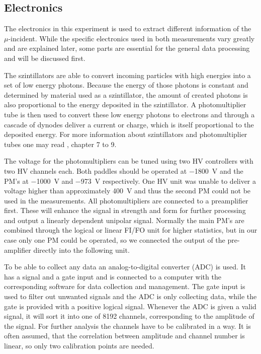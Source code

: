 \subsection{Electronics}
	
	The electronics in this experiment is used to extract different information of the $\mu$-incident.
	While the specific electronics used in both measurements vary greatly and are explained later, some parts are essential for the general data processing and will be discussed first.
	
	The szintillators are able to convert incoming particles with high energies into a set of low energy photons.
	Because the energy of those photons is constant and determined by material used as a szintillator, the amount of created photons is also proportional to the energy deposited in the szintillator.
	A photomultiplier tube is then used to convert these low energy photons to electrons and through a cascade of dynodes deliver a current or charge, which is itself proportional to the deposited energy.
	For more information about szintillators and photomultiplier tubes one may read \cite{leo1994techniques}, chapter 7 to 9.
	
	The voltage for the photomultipliers can be tuned using two HV controllers with two HV channels each.
	Both paddles should be operated at \SI{-1800}{\volt} and the PM's at \SI{-1000}{\volt} and \SI{-973}{\volt} respectively.
	One HV unit was unable to deliver a voltage higher than approximately \SI{400}{\volt} and thus the second PM could not be used in the measurements.
	All photomultipliers are connected to a preamplifier first.
	These will enhance the signal in strength and form for further processing and output a linearly dependent unipolar signal.
	Normally the main PM's are combined through the logical or linear FI/FO unit for higher statistics, but in our case only one PM could be operated, so we connected the output of the pre-amplifier directly into the following unit.
	
	To be able to collect any data an analog-to-digital converter (ADC) is used.
	It has a signal and a gate input and is connected to a computer with the corresponding software for data collection and management.
	The gate input is used to filter out unwanted signals and the ADC is only collecting data, while the gate is provided with a positive logical signal.
	Whenever the ADC is given a valid signal, it will sort it into one of 8192 channels, corresponding to the amplitude of the signal.
	For further analysis the channels have to be calibrated in a way.
	It is often assumed, that the correlation between amplitude and channel number is linear, so only two calibration points are needed.
	
